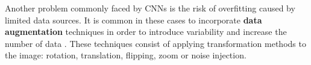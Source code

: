 Another problem commonly faced by CNNs is the risk of overfitting caused by limited data sources. It is common in these cases to incorporate \textbf{data augmentation} techniques in order to introduce variability and increase the number of data \cite{shorten_survey_2019}. These techniques consist of applying transformation methods to the image: rotation, translation, flipping, zoom or noise injection. 

